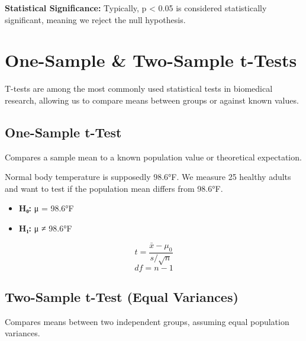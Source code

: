 \documentclass[
  11pt,
  letterpaper,
  oneside]{book}
\providecommand{\tightlist}{%
  \setlength{\itemsep}{0pt}\setlength{\parskip}{0pt}}\usepackage{longtable,booktabs,array}
\begin{document}
\textbf{Statistical Significance:} Typically, p \textless{} 0.05 is
considered statistically significant, meaning we reject the null
hypothesis.

\section{One-Sample \& Two-Sample
t-Tests}\label{one-sample-two-sample-t-tests}

T-tests are among the most commonly used statistical tests in biomedical
research, allowing us to compare means between groups or against known
values.

\subsection{One-Sample t-Test}\label{one-sample-t-test}

Compares a sample mean to a known population value or theoretical
expectation.

\begin{tcolorbox}[enhanced jigsaw, left=2mm, opacityback=0, titlerule=0mm, leftrule=.75mm, colbacktitle=quarto-callout-tip-color!10!white, title=\textcolor{quarto-callout-tip-color}{\faLightbulb}\hspace{0.5em}{One-Sample Example}, breakable, opacitybacktitle=0.6, rightrule=.15mm, colframe=quarto-callout-tip-color-frame, toprule=.15mm, bottomrule=.15mm, bottomtitle=1mm, toptitle=1mm, coltitle=black, arc=.35mm, colback=white]

Normal body temperature is supposedly 98.6°F. We measure 25 healthy
adults and want to test if the population mean differs from 98.6°F.

\begin{itemize}
\tightlist
\item
  \textbf{H₀:} μ = 98.6°F
\item
  \textbf{H₁:} μ ≠ 98.6°F
\end{itemize}

\end{tcolorbox}

\[t = \frac{\bar{x} - \mu_0}{s/\sqrt{n}}\] \[df = n - 1\]

\subsection{Two-Sample t-Test (Equal
Variances)}\label{two-sample-t-test-equal-variances}

Compares means between two independent groups, assuming equal population
variances.
\end{document}
